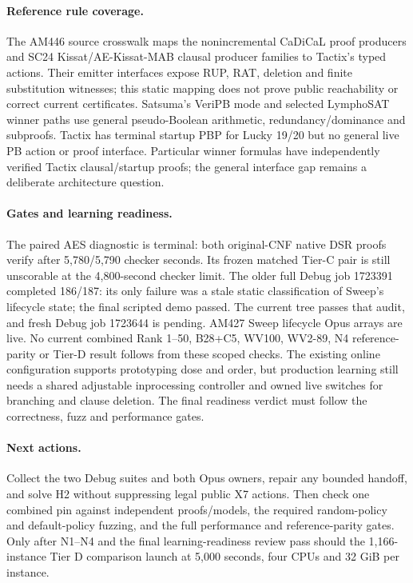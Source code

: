 \documentclass[11pt]{article}
\begin{document}
\paragraph{Reference rule coverage.}
The AM446 source crosswalk maps the nonincremental CaDiCaL proof producers
and SC24 Kissat/AE-Kissat-MAB clausal producer families to Tactix's typed
actions. Their emitter interfaces expose RUP, RAT, deletion and finite
substitution witnesses; this static mapping does not prove public reachability
or correct current certificates. Satsuma's VeriPB mode and selected
LymphoSAT winner paths use general pseudo-Boolean arithmetic,
redundancy/dominance and subproofs. Tactix has terminal startup PBP for Lucky
19/20 but no general live PB action or proof interface. Particular winner
formulas have independently verified Tactix clausal/startup proofs; the
general interface gap remains a deliberate architecture question.

\paragraph{Gates and learning readiness.}
The paired AES diagnostic is terminal: both original-CNF native DSR proofs
verify after 5,780/5,790 checker seconds. Its frozen matched Tier-C pair is
still unscorable at the 4,800-second checker limit. The older full Debug job
1723391 completed 186/187: its only failure was a stale static classification
of Sweep's lifecycle state; the final scripted demo passed. The current tree
passes that audit, and fresh Debug job 1723644 is pending. AM427 Sweep
lifecycle Opus arrays are live. No current
combined Rank 1--50, B28+C5, WV100, WV2-89, N4 reference-parity or Tier-D
result follows from these scoped checks. The existing online configuration
supports prototyping dose and order, but production learning still needs a
shared adjustable inprocessing controller and owned live switches for
branching and clause deletion. The final readiness verdict must follow the
correctness, fuzz and performance gates.

\paragraph{Next actions.}
Collect the two Debug suites and both Opus owners, repair any bounded handoff,
and solve H2 without suppressing legal public X7 actions. Then check one
combined pin against independent proofs/models, the required random-policy
and default-policy fuzzing, and the full performance and reference-parity
gates. Only after N1--N4 and the final learning-readiness review pass should
the 1,166-instance Tier D comparison launch at 5,000 seconds, four CPUs and
32 GiB per instance.
\end{document}
